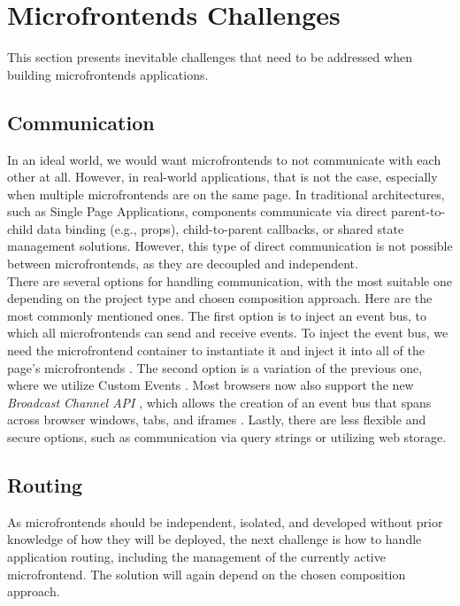 \section{Microfrontends Challenges}
\label{sec:MicrofrontendsChallenges} 
This section presents inevitable challenges that need to be addressed when building microfrontends applications.

\subsection{Communication}
In an ideal world, we would want microfrontends to not communicate with each other at all. However, in real-world applications, that is not the case, especially when multiple microfrontends are on the same page. In traditional architectures, such as Single Page Applications, components communicate via direct parent-to-child data binding (e.g., props), child-to-parent callbacks, or shared state management solutions. However, this type of direct communication is not possible between microfrontends, as they are decoupled and independent. \\

\noindent
There are several options for handling communication, with the most suitable one depending on the project type and chosen composition approach. Here are the most commonly mentioned ones. The first option is to inject an event bus, to which all microfrontends can send and receive events. To inject the event bus, we need the microfrontend container to instantiate it and inject it into all of the page's microfrontends \cite{MezzaliraBuildingMf}. The second option is a variation of the previous one, where we utilize Custom Events \cite{MezzaliraBuildingMf}\cite{Geers}. Most browsers now also support the new \emph{Broadcast Channel API} \cite{BroadcastChannelAPI}, which allows the creation of an event bus that spans across browser windows, tabs, and iframes \cite{Geers}. Lastly, there are less flexible and secure options, such as communication via query strings \cite{MezzaliraBuildingMf} or utilizing web storage.

\subsection{Routing}
As microfrontends should be independent, isolated, and developed without prior knowledge of how they will be deployed, the next challenge is how to handle application routing, including the management of the currently active microfrontend. The solution will again depend on the chosen composition approach. \\

